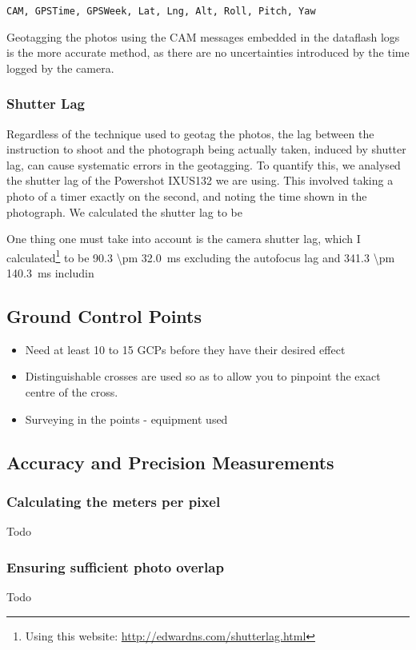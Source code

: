 \begin{verbatim}
CAM, GPSTime, GPSWeek, Lat, Lng, Alt, Roll, Pitch, Yaw
\end{verbatim}

Geotagging the photos using the CAM messages embedded in the dataflash logs is
the more accurate method, as there are no uncertainties introduced by the time
logged by the camera. 

\subsubsection{Shutter Lag}

Regardless of the technique used to geotag the photos, the lag between the
instruction to shoot and the photograph being actually taken, induced by shutter
lag, can cause systematic errors in the geotagging. To quantify this, we
analysed the shutter lag of the Powershot IXUS132 we are using. This involved
taking a photo of a timer exactly
on the second, and noting the time shown in the photograph. We calculated the
shutter lag to be 

One thing one must take into account is the camera shutter lag, which I
calculated\footnote{Using this website:
\url{http://edwardns.com/shutterlag.html}} to be \SI{90.3 \pm
32.0}{ms} excluding the autofocus lag and \SI{341.3 \pm
140.3}{ms} includin

\subsection{Ground Control Points}

\begin{itemize}

\item Need at least 10 to 15 GCPs before they have their desired effect

\item Distinguishable crosses are used so as to allow you to pinpoint the exact
centre of the cross.

\item Surveying in the points - equipment used

\end{itemize}

\subsection{Accuracy and Precision Measurements}

\subsubsection{Calculating the meters per pixel}

Todo

\subsubsection{Ensuring sufficient photo overlap}

Todo

\cite{Example}
